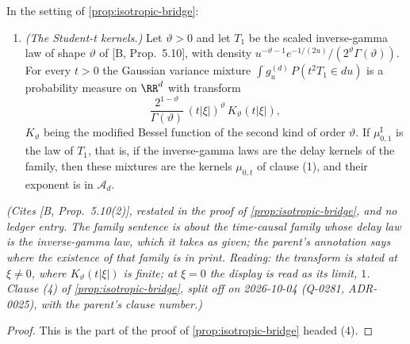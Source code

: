 \begin{proposition}
\label{prop:isotropic-bridge-student}
\leanok
In the setting of \ref{prop:isotropic-bridge}:
\begin{enumerate}
\item[(4)] \emph{(The Student-t kernels.)} Let $\vartheta > 0$ and let $T_1$ be the scaled
inverse-gamma law of shape $\vartheta$ of [B, Prop.~5.10], with density
$u^{-\vartheta-1}e^{-1/(2u)}/(2^\vartheta\Gamma(\vartheta))$. For every
$t > 0$ the Gaussian variance mixture $\int g^{(d)}_u\,P(t^2T_1 \in du)$ is a probability measure
on $\RR^d$ with transform
\[
  \frac{2^{1-\vartheta}}{\Gamma(\vartheta)}\,(t|\xi|)^\vartheta\,K_\vartheta(t|\xi|) ,
\]
$K_\vartheta$ being the modified Bessel function of the second kind of order $\vartheta$.
If $\mu^{\mathrm I}_{0,1}$ is the law of $T_1$, that is, if the inverse-gamma laws are the
delay kernels of the family, then these mixtures are the kernels $\mu_{0,t}$ of
clause (1), and their exponent is in $\mathcal{A}_d$.
\end{enumerate}
\statusT\quad\emph{(Cites [B, Prop.~5.10(2)], restated in the proof of
\ref{prop:isotropic-bridge}, and no ledger entry. The family sentence is about the time-causal
family whose delay law is the inverse-gamma law, which it takes as given; the parent's annotation
says where the existence of that family is in print. Reading: the transform is stated at $\xi \ne 0$, where $K_\vartheta(t|\xi|)$ is finite; at
$\xi = 0$ the display is read as its limit, $1$. Clause (4) of \ref{prop:isotropic-bridge}, split off
on 2026-10-04 (Q-0281, ADR-0025), with the parent's clause number.)}
\end{proposition}

\begin{proof}
\leanok
This is the part of the proof of \ref{prop:isotropic-bridge} headed (4).
\end{proof}
